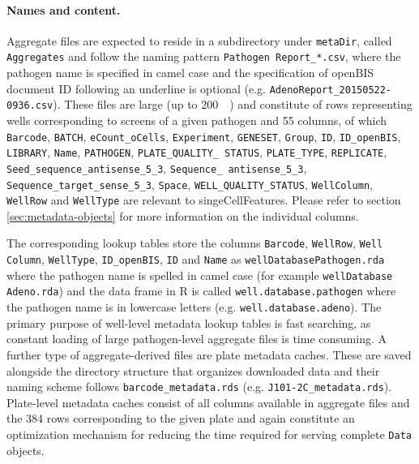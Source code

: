 \paragraph{Names and content.}
Aggregate files are expected to reside in a subdirectory under \texttt{metaDir}, called \texttt{Aggregates} and follow the naming pattern \texttt{Pathogen Report_*.csv}, where the pathogen name is specified in camel case and the specification of openBIS document ID following an underline is optional (e.g. \texttt{AdenoReport_20150522-0936.csv}). These files are large (up to \SI{200}{\mega\byte}) and constitute of rows representing wells corresponding to screens of a given patho\-gen and 55 columns, of which \texttt{Barcode}, \texttt{BATCH}, \texttt{eCount_oCells}, \texttt{Experiment}, \texttt{GENESET}, \texttt{Group}, \texttt{ID}, \texttt{ID_openBIS}, \texttt{LIBRARY}, \texttt{Name}, \texttt{PATHOGEN}, \texttt{PLATE_QUALITY_ STATUS}, \texttt{PLATE_TYPE}, \texttt{REPLICATE}, \texttt{Seed_sequence_antisense_5_3}, \texttt{Sequence_ antisense_5_3}, \texttt{Sequence_target_sense_5_3}, \texttt{Space}, \texttt{WELL_QUALITY_STATUS}, \texttt{WellColumn}, \texttt{WellRow} and \texttt{WellType} are relevant to singeCellFeatures. Please refer to section \ref{sec:metadata-objects} for more information on the individual columns.

The corresponding lookup tables store the columns \texttt{Barcode}, \texttt{WellRow}, \texttt{Well Column}, \texttt{WellType}, \texttt{ID_openBIS}, \texttt{ID} and \texttt{Name} as \texttt{wellDatabasePathogen.rda} where the pathogen name is spelled in camel case (for example \texttt{wellDatabase Adeno.rda}) and the data frame in R is called \texttt{well.database.pathogen} where the pathogen name is in lowercase letters (e.g. \texttt{well.database.adeno}). The primary purpose of well-level metadata lookup tables is fast searching, as constant loading of large pathogen-level aggregate files is time consuming. A further type of aggregate-derived files are plate metadata caches. These are saved alongside the directory structure that organizes downloaded data and their naming scheme follows \texttt{barcode_metadata.rds} (e.g. \texttt{J101-2C_metadata.rds}). Plate-level metadata caches consist of all columns available in aggregate files and the 384 rows corresponding to the given plate and again constitute an optimization mechanism for reducing the time required for serving complete \texttt{Data} objects.


